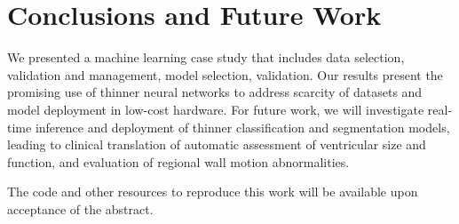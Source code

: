 \documentclass[mlabstract,twocolumn]{jmlr}
\begin{document}
\section{Conclusions and Future Work}
We presented a machine learning case study that includes data selection, validation and management, model selection, validation.
Our results present the promising use of thinner neural networks to address scarcity of datasets and model deployment in low-cost hardware.
For future work, we will investigate real-time inference and deployment of thinner classification and segmentation models, leading to clinical translation of automatic assessment of ventricular size and function, and evaluation of regional wall motion abnormalities.

The code and other resources to reproduce this work will be available upon acceptance of the abstract.
\end{document}

